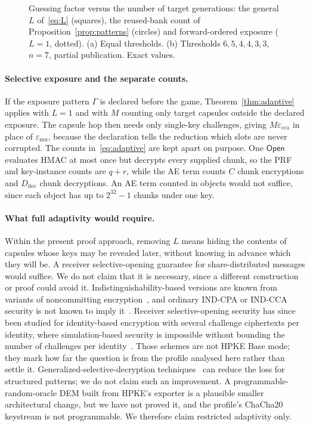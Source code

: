 \documentclass[pdflatex,sn-mathphys-num]{sn-jnl}%
\theoremstyle{plain}
\theoremstyle{definition}
\begin{document}
\begin{figure}[t]
\centering
\figbox{}
\caption{Guessing factor versus the number of target generations: the general $L$ of~\eqref{eq:L} (squares), the reused-bank count of Proposition~\ref{prop:patterns} (circles) and forward-ordered exposure ($L=1$, dotted). (a) Equal thresholds. (b) Thresholds $6,5,4,4,3,3$, $n=7$, partial publication. Exact values.}\label{fig:guess}
\end{figure}

\paragraph{Selective exposure and the separate counts.}
If the exposure pattern $\Gamma$ is declared before the game, Theorem~\ref{thm:adaptive} applies with $L=1$ and with $M$ counting only target capsules outside the declared exposure. The capsule hop then needs only single-key challenges, giving $M\varepsilon_{\mathrm{cca}}$ in place of $\varepsilon_{\mathrm{mu}}$, because the declaration tells the reduction which slots are never corrupted. The counts in~\eqref{eq:adaptive} are kept apart on purpose. One $\mathsf{Open}$ evaluates HMAC at most once but decrypts every supplied chunk, so the PRF and key-instance counts are $q+r$, while the AE term counts $C$ chunk encryptions and $D_{\mathrm{dec}}$ chunk decryptions. An AE term counted in objects would not suffice, since each object has up to $2^{32}-1$ chunks under one key.

\paragraph{What full adaptivity would require.}
Within the present proof approach, removing $L$ means hiding the contents of capsules whose keys may be revealed later, without knowing in advance which they will be. A receiver selective-opening guarantee for share-distributed messages would suffice. We do not claim that it is necessary, since a different construction or proof could avoid it. Indistinguishability-based versions are known from variants of noncommitting encryption~\cite{hazay2015,canetti1996}, and ordinary IND-CPA or IND-CCA security is not known to imply it~\cite{bellare2009}. Receiver selective-opening security has since been studied for identity-based encryption with several challenge ciphertexts per identity, where simulation-based security is impossible without bounding the number of challenges per identity~\cite{huang2023rso}. Those schemes are not HPKE Base mode; they mark how far the question is from the profile analysed here rather than settle it. Generalized-selective-decryption techniques~\cite{panjwani2007,jafargholi2017} can reduce the loss for structured patterns; we do not claim such an improvement. A programmable-random-oracle DEM built from HPKE's exporter is a plausible smaller architectural change, but we have not proved it, and the profile's ChaCha20 keystream is not programmable. We therefore claim restricted adaptivity only.
\end{document}
